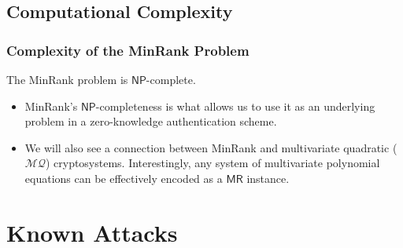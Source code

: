 \documentclass[serif, hyperref={unicode, breaklinks}, xcolor={x11names, psnames,
  dvipsnames, table}, usepdftitle=false]{beamer}
\newcommand{\MR}{\ensuremath{\mathsf{MR}}}
\newcommand{\NP}{\ensuremath{\mathsf{NP}}}
\newcommand{\MQ}{\ensuremath{\mathcal{MQ}}}
\begin{document}
\subsection{Computational Complexity}
\begin{frame}
  \frametitle{Complexity of the MinRank Problem}
  \begin{theorem}\label{thm:mr-comp}
    The MinRank problem is \NP-complete.
  \end{theorem}
  \begin{itemize}
  \item MinRank's \NP-completeness is what allows us to use it as an underlying
    problem in a zero-knowledge authentication scheme.
  \item We will also see a connection between MinRank and multivariate quadratic
    (\MQ) cryptosystems.  Interestingly, any system of multivariate polynomial
    equations can be effectively encoded as a \MR{} instance.
  \end{itemize}
\end{frame}

\section{Known Attacks}
\end{document}
